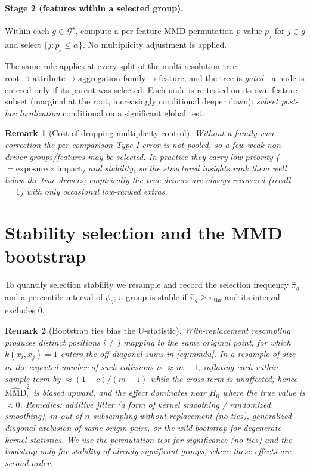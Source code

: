\documentclass[11pt]{article}
\newtheorem{remark}{Remark}
\newcommand{\Gcal}{\mathcal{G}}
\newcommand{\MMD}{\mathrm{MMD}}
\begin{document}
\paragraph{Stage 2 (features within a selected group).}
Within each $g\in\Gcal^\star$, compute a per-feature MMD permutation $p$-value
$p_j$ for $j\in g$ and select $\{j: p_j\le\alpha\}$. No multiplicity adjustment
is applied.

The same rule applies at every split of the multi-resolution tree
$\text{root}\to\text{attribute}\to\text{aggregation family}\to\text{feature}$,
and the tree is \emph{gated}---a node is entered only if its parent was
selected. Each node is re-tested on its own feature subset (marginal at the
root, increasingly conditional deeper down): \emph{subset post-hoc localization}
conditional on a significant global test.

\begin{remark}[Cost of dropping multiplicity control]
Without a family-wise correction the per-comparison Type-I error is not pooled,
so a few weak non-driver groups/features may be selected. In practice they carry
low priority ($=\text{exposure}\times\text{impact}$) and stability, so the
structured insights rank them well below the true drivers; empirically the true
drivers are always recovered (recall $=1$) with only occasional low-ranked
extras.
\end{remark}

\section{Stability selection and the MMD bootstrap}
\label{sec:stability}

To quantify selection stability we resample and record the selection frequency
$\hat\pi_g$ and a percentile interval of $\phi_g$; a group is stable if
$\hat\pi_g\ge\pi_{\mathrm{thr}}$ and its interval excludes $0$.

\begin{remark}[Bootstrap ties bias the U-statistic]
With-replacement resampling produces distinct positions $i\neq j$ mapping to the
same original point, for which $k(x_i,x_j)=1$ enters the off-diagonal sums in
\eqref{eq:mmdu}. In a resample of size $m$ the expected number of such collisions
is $\approx m-1$, inflating each within-sample term by $\approx(1-c)/(m-1)$ while
the cross term is unaffected; hence $\widehat{\MMD}^2_u$ is biased \emph{upward},
and the effect dominates near $H_0$ where the true value is $\approx0$.
Remedies: additive jitter (a form of kernel smoothing / randomized smoothing),
$m$-out-of-$n$ subsampling without replacement (no ties), generalized diagonal
exclusion of same-origin pairs, or the wild bootstrap for degenerate kernel
statistics. We use the permutation test for \emph{significance} (no ties) and the
bootstrap only for stability of already-significant groups, where these effects
are second order.
\end{remark}
\end{document}

